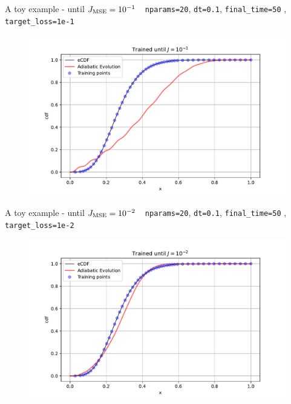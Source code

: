 \documentclass[9pt, xcolor={svgnames}, hyperref={colorlinks, linkcolor=black, citecolor=amethyst, urlcolor=amethyst}]{beamer}
\begin{document}
\begin{frame}[fragile]{A toy example - until $J_{\rm MSE}=10^{-1}$}
\large
\faArrowCircleRight\,\, \texttt{nparams=20}, \texttt{dt=0.1}, \texttt{final\_time=50}
, \texttt{target\_loss=1e-1}
\begin{figure}
    \includegraphics[width=1\textwidth]{figures/ev1.pdf}
\end{figure}
\end{frame}

\begin{frame}[fragile]{A toy example - until $J_{\rm MSE}=10^{-2}$}
\large
\faArrowCircleRight\,\, \texttt{nparams=20}, \texttt{dt=0.1}, \texttt{final\_time=50}
, \texttt{target\_loss=1e-2}
\begin{figure}
    \includegraphics[width=1\textwidth]{figures/ev2.pdf}
\end{figure}
\end{frame}
\end{document}
